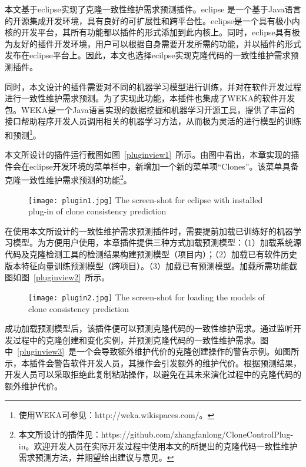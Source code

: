 本文基于eclipse实现了克隆一致性维护需求预测插件。eclipse 是一个基于Java语言的开源集成开发环境，具有良好的可扩展性和跨平台性。eclipse是一个具有极小内核的开发平台，其所有功能都以插件的形式添加到此内核上。同时，eclipse具有极为友好的插件开发环境，用户可以根据自身需要开发所需的功能，并以插件的形式发布在eclipse平台上。因此，本文也选择ecilpse实现克隆代码的一致性维护需求预测插件。

同时，本文设计的插件需要对不同的机器学习模型进行训练，并对在软件开发过程进行一致性维护需求预测。为了实现此功能，本插件也集成了WEKA的软件开发包。WEKA是一个Java语言实现的数据挖掘和机器学习开源工具，提供了丰富的接口帮助程序开发人员调用相关的机器学习方法，从而极为灵活的进行模型的训练和预测\footnote{使用WEKA可参见：http://weka.wikispaces.com/。}。

本文所设计的插件运行截图如图~\ref{pluginview1}~所示。由图中看出，本章实现的插件会在eclipse开发环境的菜单栏中，新增加一个新的菜单项“Clones”。该菜单具备克隆一致性维护需求预测的功能\footnote{本文所设计的插件见：https://github.com/zhangfanlong/CloneControlPlug-in。欢迎开发人员在实际开发过程中使用本文的所提出的克隆代码一致性维护需求预测方法，并期望给出建议与意见。}。

\begin{figure}[htbp]
\centering
\texttt{[image: plugin1.jpg]}
{The screen-shot for eclipse with installed plug-in of clone consistency prediction}
\vspace{-1em}
\end{figure}

在使用本文所设计的一致性维护需求预测插件时，需要提前加载已训练好的机器学习模型。为方便用户使用，本章插件提供三种方式加载预测模型：（1）加载系统源代码及克隆检测工具的检测结果构建预测模型（项目内）；（2）加载已有软件历史版本特征向量训练预测模型（跨项目）。（3）加载已有预测模型。加载所需功能截图如图~\ref{pluginview2}~所示。

\begin{figure}[htbp]
\centering
\texttt{[image: plugin2.jpg]}
{The screen-shot for loading the models of clone consistency prediction}
\vspace{-1em}
\end{figure}

成功加载预测模型后，该插件便可以预测克隆代码的一致性维护需求。通过监听开发过程中的克隆创建和变化实例，并预测克隆代码的一致性维护需求。图中~\ref{pluginview3}~是一个会导致额外维护代价的克隆创建操作的警告示例。如图所示，本插件会警告软件开发人员，其操作会引发额外的维护代价。根据预测结果，开发人员可以采取拒绝此复制粘贴操作，以避免在其未来演化过程中的克隆代码的额外维护代价。

